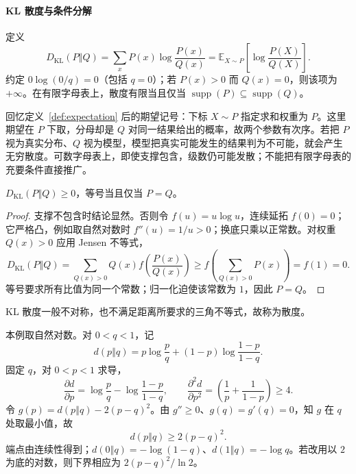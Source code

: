 \documentclass[lang=cn,a4paper,fontset=none,zihao=false,10pt,openany,twoside]{beautybook}
\numberwithin{algorithm}{chapter}
\newcommand{\KLsep}{\mathrel{\Vert}}
\begin{document}
\paragraph{KL 散度与条件分解}
\begin{definition}[KL 散度]\label{def:kl-divergence}
定义
\[
 D_{\mathrm{KL}}(P\KLsep Q)=\sum_xP(x)\log\frac{P(x)}{Q(x)}
 =\mathbb E_{X\sim P}\left[\log\frac{P(X)}{Q(X)}\right].
\]
约定 $0\log(0/q)=0$（包括 $q=0$）；若 $P(x)>0$ 而 $Q(x)=0$，则该项为 $+\infty$。在有限字母表上，散度有限当且仅当 $\operatorname{supp}(P)\subseteq\operatorname{supp}(Q)$。
\end{definition}
回忆定义~\ref{def:expectation} 后的期望记号：下标 $X\sim P$ 指定求和权重为 $P$。这里期望在 $P$ 下取，分母却是 $Q$ 对同一结果给出的概率，故两个参数有次序。若把 $P$ 视为真实分布、$Q$ 视为模型，模型把真实可能发生的结果判为不可能，就会产生无穷散度。可数字母表上，即使支撑包含，级数仍可能发散；不能把有限字母表的充要条件直接推广。
\begin{proposition}\label{prop:gibbs-inequality}
$D_{\mathrm{KL}}(P\KLsep Q)\ge0$，等号当且仅当 $P=Q$。
\end{proposition}
\begin{proof}
支撑不包含时结论显然。否则令 $f(u)=u\log u$，连续延拓 $f(0)=0$；它严格凸，例如取自然对数时 $f''(u)=1/u>0$；换底只乘以正常数。对权重 $Q(x)>0$ 应用 Jensen 不等式，
\[
 D_{\mathrm{KL}}(P\KLsep Q)=\sum_{Q(x)>0}Q(x)f\left(\frac{P(x)}{Q(x)}\right)
 \ge f\left(\sum_{Q(x)>0}P(x)\right)=f(1)=0.
\]
等号要求所有比值为同一个常数；归一化迫使该常数为 $1$，因此 $P=Q$。
\end{proof}
KL 散度一般不对称，也不满足距离所要求的三角不等式，故称为散度。
\begin{example}[二元 KL 散度的二次下界]\label{ex:binary-kl}
本例取自然对数。对 $0<q<1$，记
\[
 d(p\KLsep q)=p\log\frac pq+(1-p)\log\frac{1-p}{1-q}.
\]
固定 $q$，对 $0<p<1$ 求导，
\[
 \frac{\partial d}{\partial p}=\log\frac pq-\log\frac{1-p}{1-q},\qquad
 \frac{\partial^2d}{\partial p^2}=\left(\frac1p+\frac1{1-p}\right)\ge4.
\]
令 $g(p)=d(p\KLsep q)-2(p-q)^2$。由 $g''\ge0$、$g(q)=g'(q)=0$，知 $g$ 在 $q$ 处取最小值，故
\[
 d(p\KLsep q)\ge2(p-q)^2.
\]
端点由连续性得到；$d(0\KLsep q)=-\log(1-q)$、$d(1\KLsep q)=-\log q$。若改用以 $2$ 为底的对数，则下界相应为 $2(p-q)^2/\ln2$。
\end{example}
\begin{center}
\end{center}
\end{document}
